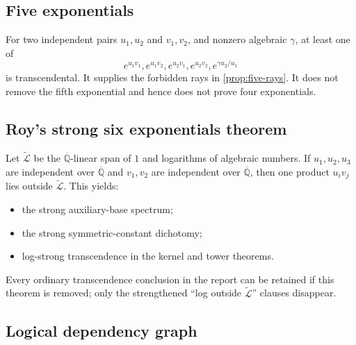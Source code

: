 \documentclass[11pt,oneside]{article}
\theoremstyle{definition}
\theoremstyle{remark}
\newcommand{\Qbar}{\overline{\mathbb Q}}
\newcommand{\LL}{\widetilde{\mathcal L}}
\begin{document}
\subsection{Five exponentials}

For two independent pairs $u_1,u_2$ and $v_1,v_2$, and nonzero algebraic $\gamma$, at least
one of
\[
 e^{u_1v_1},e^{u_1v_2},e^{u_2v_1},e^{u_2v_2},
 e^{\gamma u_2/u_1}
\]
is transcendental.  It supplies the forbidden rays in \cref{prop:five-rays}.  It does not
remove the fifth exponential and hence does not prove four exponentials.

\subsection{Roy's strong six exponentials theorem}

Let $\LL$ be the $\Qbar$-linear span of $1$ and logarithms of algebraic numbers.  If
$u_1,u_2,u_3$ are independent over $\Qbar$ and $v_1,v_2$ are independent over $\Qbar$, then
one product $u_iv_j$ lies outside $\LL$.  This yields:

\begin{itemize}
\item the strong auxiliary-base spectrum;
\item the strong symmetric-constant dichotomy;
\item log-strong transcendence in the kernel and tower theorems.
\end{itemize}

Every ordinary transcendence conclusion in the report can be retained if this theorem is
removed; only the strengthened ``log outside $\LL$'' clauses disappear.

\subsection{Logical dependency graph}
\end{document}
